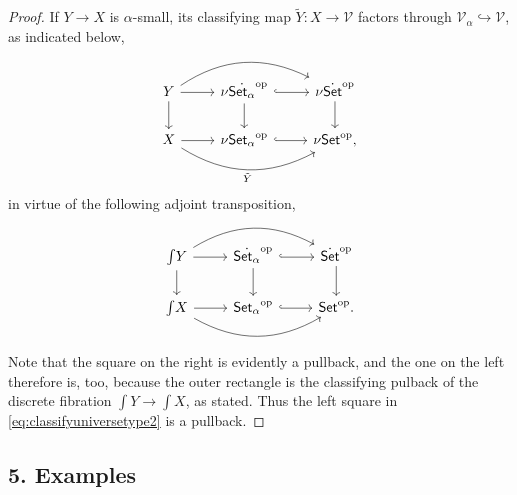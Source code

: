 \documentclass[11pt]{article}
\newcommand{\op}[1]{\ensuremath{{#1}^{\mathrm{op}}}}
\newcommand{\Set}{\ensuremath{\mathsf{Set}}}
\newcommand{\hook}{\ensuremath{\hookrightarrow}}
\renewcommand{\to}{\ensuremath{\rightarrow}}
\newcommand{\V}{\ensuremath{\mathcal{V}}}
\newcommand{\elem}[1]{\textstyle\int\!{#1}}
\theoremstyle{remark}
\theoremstyle{definition}
\begin{document}
\begin{proof} If $Y\to X$ is $\alpha$-small, its classifying map $\tilde{Y} : X\to\V$ factors through $\V_\alpha \hook \V$, as indicated below, 
\begin{equation}\label{eq:classifyuniversetype2}\textstyle
\begin{tikzcd}
	 Y \ar[d] \ar[rr, bend left] \ar[r] & \nu\op{\dot{\Set_\alpha}} \ar[d] \ar[r,hook] & \nu\op{\dot{\Set}} \ar[d]\\  
	X \ar[rr, bend right, swap,"\tilde{Y}"] \ar[r] &  \nu\op{\Set_\alpha} \ar[r,hook] &  \nu\op{\Set},
 \end{tikzcd}
 \end{equation}
%
in virtue of the following adjoint transposition,
\begin{equation}\label{eq:adjointtranspose}\textstyle
\begin{tikzcd}
	 \elem Y \ar[d] \ar[rr, bend left] \ar[r] & \op{\dot{\Set_\alpha}} \ar[d] \ar[r,hook] & \op{\dot{\Set}} \ar[d]\\  
	 \elem X \ar[rr, bend right, ] \ar[r]  &  \op{\Set_\alpha} \ar[r,hook]  &  \op{\Set}.
 \end{tikzcd}
  \end{equation}
Note that the square on the right is evidently a pullback, and the one on the left therefore is, too, because the outer rectangle is the classifying pulback of the discrete fibration $\elem Y \to \elem X$, as stated.  Thus the left square in \eqref{eq:classifyuniversetype2} is a pullback.
\end{proof}

\subsection*{5. Examples}
\end{document}
